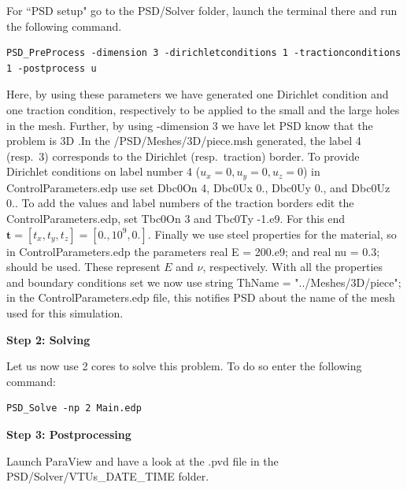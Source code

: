For ``PSD setup" go to the {\ttfamily PSD/Solver} folder, launch the terminal there and run the following command.
\begin{lstlisting}[style=Linux]
PSD_PreProcess -dimension 3 -dirichletconditions 1 -tractionconditions 1 -postprocess u
\end{lstlisting}
Here, by using these parameters we have generated one Dirichlet condition and one traction condition, respectively to be applied to the small and the large holes in the mesh. Further, by using {\ttfamily -dimension 3} we have let PSD know that the problem is 3D .In the {\ttfamily /PSD/Meshes/3D/piece.msh} generated, the label 4 (resp.~3) corresponds to the Dirichlet (resp.~traction) border. 
To provide Dirichlet conditions on label number 4 ($u_x=0,u_y=0,u_z=0$) in {\ttfamily ControlParameters.edp} use set {\ttfamily Dbc0On 4}, {\ttfamily Dbc0Ux 0.}, {\ttfamily Dbc0Uy 0.}, and {\ttfamily Dbc0Uz 0.}. To add the values and label numbers of the traction borders edit the  {\ttfamily ControlParameters.edp}, set  {\ttfamily Tbc0On 3} and {\ttfamily Tbc0Ty -1.e9}. For this end $\mathbf t=[t_x,t_y,t_z]=[0.,10^9,0.]$. Finally we use steel properties for the material, so in {\ttfamily ControlParameters.edp} the parameters {\ttfamily real E  = 200.e9;} and {\ttfamily real nu = 0.3;} should be used. These represent $E$ and $\nu$, respectively. With all the properties and boundary conditions set we now use  {\ttfamily string ThName = "../Meshes/3D/piece";} in the {\ttfamily ControlParameters.edp} file, this notifies PSD about the name of the mesh used for this simulation.  

\textbf{Step 2: Solving}

Let us now use 2 cores to solve this problem. To do so enter the following command:

\begin{lstlisting}[style=Linux]
PSD_Solve -np 2 Main.edp
\end{lstlisting}

\textbf{Step 3: Postprocessing}

Launch ParaView and have a look at the  {\ttfamily .pvd} file in the  {\ttfamily PSD/Solver/VTUs\_DATE\_TIME} folder. 

